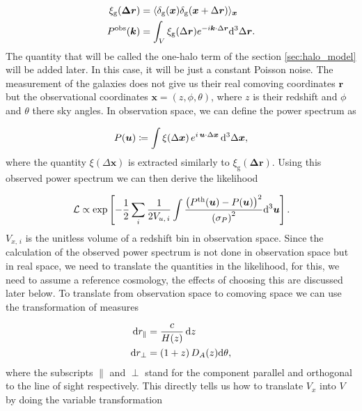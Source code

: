\documentclass[../main.tex]{subfiles}
\begin{document}
\begin{align}
    \xi_\mathrm{g}(\boldsymbol{\Delta r}) &= \langle \delta_\mathrm{g}(\boldsymbol{x}) \delta_\mathrm{g}(\boldsymbol{x}+\Delta \boldsymbol{r}) \rangle_{\boldsymbol{x}}\\
    P^\mathrm{obs}(\boldsymbol{k}) &= \int_V \xi_\mathrm{g}(\Delta \boldsymbol{r}) e^{-i \boldsymbol{k}\cdot \Delta \boldsymbol{r}} \mathrm{d}^3 \Delta\boldsymbol{r}.
\end{align}
The quantity that will be called the one-halo term of the section \ref{sec:halo_model} will be added later. In this case, it will be just a constant Poisson noise.
The measurement of the galaxies does not give us their real comoving coordinates $\boldsymbol{r}$ but the observational coordinates $\boldsymbol{x}=(z,\phi,\theta)$, where $z$ is their redshift and $\phi$ and $\theta$ there sky angles. In observation space, we can define the power spectrum as 

\begin{equation}
    P(\boldsymbol{u}) \coloneq \int \xi(\Delta \boldsymbol{x}) \, e^{i \, \boldsymbol{u}\cdot \Delta\boldsymbol{x}} \,\mathrm{d}^3 \Delta\boldsymbol{x},
 \end{equation} 
where the quantity $\xi(\Delta \boldsymbol{x})$ is extracted similarly to $\xi_\mathrm{g}(\boldsymbol{\Delta r}) $. Using this observed power spectrum we can then derive the likelihood 

 \begin{equation}
    \mathcal{L} \propto \exp\left[-\frac{1}{2} \sum_i \frac{1}{2 V_{u,\,i}} \int \frac{\left(P^\mathrm{th}(\boldsymbol{u})-P(\boldsymbol{u})\right)^2}{\left(\sigma_{P}\right)^2} \mathrm{d}^3 \boldsymbol{u} \right].
 \end{equation}
$V_{x,\, i}$ is the unitless volume of a redshift bin in observation space. Since the calculation of the observed power spectrum is not done in observation space but in real space, we need to translate the quantities in the likelihood, for this, we need to assume a reference cosmology, the effects of choosing this are discussed later below. To translate from observation space to comoving space we can use the transformation of measures

\begin{align}
    \mathrm{d} r_{\|} &= \frac{c}{H(z)}\, \mathrm{d} z     \nonumber\\
    \mathrm{d} r_\perp &= \left( 1+ z \right) D_A(z) \mathrm{d} \theta,     \label{eq:transformation_orth}
\end{align} 
where the subscripts $\|$ and $\perp$ stand for the component parallel and orthogonal to the line of sight respectively. This directly tells us how to translate $V_x$ into $V$ by doing the variable transformation 
\end{document}
